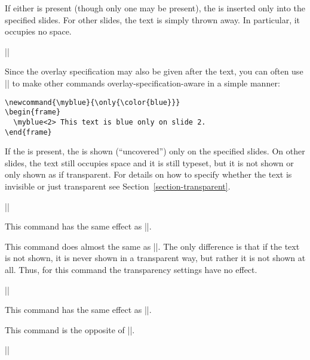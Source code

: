 \begin{command}{\only{}}
  If either  is present (though only one may be present), the  is inserted only into the specified slides. For other slides, the text is simply thrown away. In particular, it occupies no space.

  \example
  ||

  Since the overlay specification may also be given after the text, you can often use |\only| to make other commands overlay-specification-aware in a simple manner:

  \example
\begin{verbatim}
\newcommand{\myblue}{\only{\color{blue}}}
\begin{frame}
  \myblue<2> This text is blue only on slide 2.
\end{frame}
\end{verbatim}
\end{command}

\begin{command}{\uncover{}}
  If the  is present, the  is shown (``uncovered'') only on the specified slides. On other slides, the text still occupies space and it is still typeset, but it is not shown or only shown as if transparent. For details on how to specify whether the text is invisible or just transparent see Section~\ref{section-transparent}.

  \example
  ||

  \articlenote
  This command has the same effect as |\only|.
\end{command}

\begin{command}{\visible{}}
  This command does almost the same as |\uncover|. The only difference is that if the text is not shown, it is never shown in a transparent way, but rather it is not shown at all. Thus, for this command the transparency settings have no effect.

  \example
  ||

  \articlenote
  This command has the same effect as |\only|.
\end{command}

\begin{command}{\invisible{}}
  This command is the opposite of |\visible|.

  \example
  ||
\end{command}

